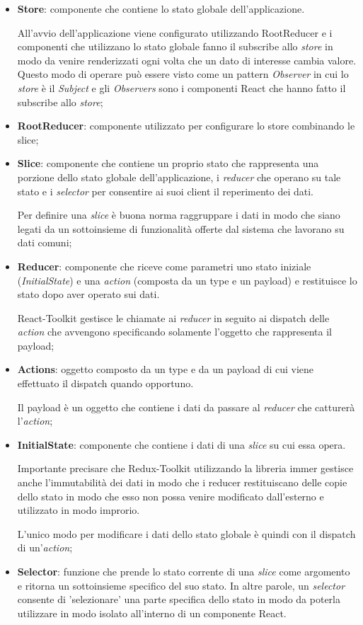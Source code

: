 \begin{itemize}
	\item \textbf{Store}: componente che contiene lo stato globale dell'applicazione.
	
	All'avvio dell'applicazione viene configurato utilizzando RootReducer e i componenti che utilizzano lo stato globale fanno il subscribe allo \textit{store}
	in modo da venire renderizzati ogni volta che un dato di interesse cambia valore.
	Questo modo di operare può essere visto come un pattern \textit{Observer} in cui lo \textit{store} è il \textit{Subject} e gli \textit{Observers} sono i componenti React che hanno fatto 
	il subscribe allo \textit{store};
	\item \textbf{RootReducer}: componente utilizzato per configurare lo store combinando le slice;
	\item \textbf{Slice}: componente che contiene un proprio stato che rappresenta una porzione dello stato globale dell'applicazione, i \textit{reducer}
	che operano su tale stato e i \textit{selector} per consentire ai suoi client il reperimento dei dati. 

	Per definire una \textit{slice} è buona norma raggruppare i dati in modo che siano legati da un sottoinsieme di funzionalità offerte dal sistema che lavorano 
	su dati comuni;  
	\item \textbf{Reducer}: componente che riceve come parametri uno stato iniziale (\textit{InitialState}) e una \textit{action} (composta da un type e un payload) e restituisce 
	lo stato dopo aver operato sui dati. 
	
	React-Toolkit gestisce le chiamate ai \textit{reducer} in seguito ai dispatch delle \textit{action} che avvengono
	specificando solamente l'oggetto che rappresenta il payload;
	\item \textbf{Actions}: oggetto composto da un type e da un payload di cui viene effettuato il dispatch quando opportuno. 
	
	Il payload è un oggetto che contiene i dati da passare al \textit{reducer} che catturerà l'\textit{action};
	\item \textbf{InitialState}: componente che contiene i dati di una \textit{slice} su cui essa opera. 
	
	Importante precisare che Redux-Toolkit utilizzando 
	la libreria immer gestisce anche l'immutabilità dei dati in modo che i reducer restituiscano delle copie dello stato in modo che esso non possa 
	venire modificato dall'esterno e utilizzato in modo improrio.
	
	L'unico modo per modificare i dati dello stato globale è quindi con il dispatch di un'\textit{action};
	\item \textbf{Selector}: funzione che prende lo stato corrente di una \textit{slice} come argomento e ritorna un sottoinsieme specifico
	del suo stato. In altre parole, un \textit{selector} consente di 'selezionare' una parte specifica dello stato
	in modo da poterla utilizzare in modo isolato all'interno di un componente React.
\end{itemize}

